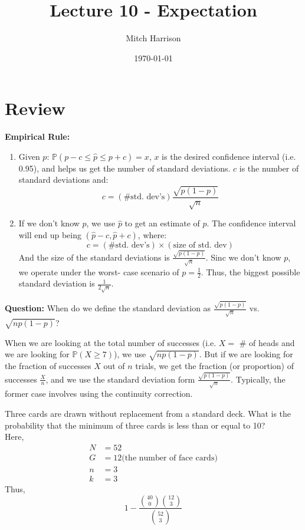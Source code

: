 \documentclass[titlepage, 12pt, leqno]{article}
\title{\Huge{Lecture 10 - Expectation}}
\author{\large{Mitch Harrison}}
\date{\today}
\begin{document}
\setlength{\parskip}{1\baselineskip}
\setlength{\parindent}{15pt}
\maketitle
\tableofcontents
\newpage


\section{Review}
\textbf{Empirical Rule:}

\begin{enumerate}
    \item Given $p$: $\mathbb{P}(p-c \le \hat p \le p+c) = x$, $x$ is the 
        desired confidence interval (i.e. 0.95), and helps us get the number of
        standard deviations. $c$ is the number of standard deviations and:
        \[
            c = ( \text{\# std. dev's})\frac{\sqrt{p(1-p)}}{\sqrt{n}}
        \]
    \item If we don't know $p$, we use $\hat p$ to get an estimate of $p$. The
        confidence interval will end up being $(\hat p-c, \hat p+c)$, where:
        \[
        c = ( \text{\# std. dev's}) \times ( \text{size of std. dev})
        \]
        And the size of the standard deviations is $\frac{\sqrt{p(1-
        p)}}{\sqrt{n}}$. Sinc we don't know $p$, we operate under the worst-
        case scenario of $p=\frac{1}{2}$. Thus, the biggest possible standard
        deviation is $\frac{1}{2\sqrt{n}}$.
\end{enumerate}

\textbf{Question:} When do we define the standard deviation as $\frac{\sqrt{p(1-p)}}{\sqrt{n}}$ vs. $\sqrt{np(1-p)}$?

When we are looking at the total number of successes (i.e. $X =$ \# of heads
and we are looking for $\mathbb{P}(X\ge 7)$), we use $\sqrt{np(1-p)}$. But if we
are looking for the fraction of successes $X$ out of $n$ trials, we get the 
fraction (or proportion) of successes $\frac{X}{n}$, and we use the standard
deviation form $\frac{\sqrt{p(1-p)}}{\sqrt{n}}$. Typically, the former case
involves using the continuity correction.

\begin{ex}
    Three cards are drawn without replacement from a standard deck. What is the
    probability that the minimum of three cards is less than or equal to 10?
    \\[.1in]
    Here,
   \begin{align*}
       N &= 52 \\
       G &= 12 \text{(the number of face cards)}\\
       n &= 3 \\
       k &= 3
   \end{align*}
   Thus,
    \[
        \boxed{1 - \frac{\binom{40}{0}\binom{12}{3}}{\binom{52}{3}}} 
    \]
\end{ex}
\end{document}
